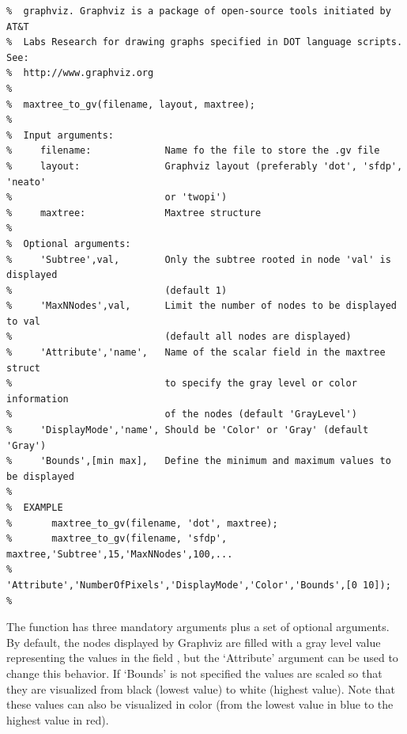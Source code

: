 \documentclass[DIV=calc, paper=a4, fontsize=11pt]{scrartcl}	 %
\begin{document}
\begin{lstlisting}[aboveskip=0.5 \baselineskip]
%  maxtree_to_gv prints the Maxtree on a text file for vizualization with
%  graphviz. Graphviz is a package of open-source tools initiated by AT&T
%  Labs Research for drawing graphs specified in DOT language scripts. See:
%  http://www.graphviz.org
% 
%  maxtree_to_gv(filename, layout, maxtree);
%
%  Input arguments:
%     filename:             Name fo the file to store the .gv file 
%     layout:               Graphviz layout (preferably 'dot', 'sfdp', 'neato' 
%                           or 'twopi')
%     maxtree:              Maxtree structure
%
%  Optional arguments:
%     'Subtree',val,        Only the subtree rooted in node 'val' is displayed 
%                           (default 1)
%     'MaxNNodes',val,      Limit the number of nodes to be displayed to val
%                           (default all nodes are displayed)
%     'Attribute','name',   Name of the scalar field in the maxtree struct 
%                           to specify the gray level or color information 
%                           of the nodes (default 'GrayLevel')
%     'DisplayMode','name', Should be 'Color' or 'Gray' (default 'Gray') 
%     'Bounds',[min max],   Define the minimum and maximum values to be displayed 
% 
%  EXAMPLE
%       maxtree_to_gv(filename, 'dot', maxtree);
%       maxtree_to_gv(filename, 'sfdp', maxtree,'Subtree',15,'MaxNNodes',100,...
%           'Attribute','NumberOfPixels','DisplayMode','Color','Bounds',[0 10]);
%

\end{lstlisting}
The function has three mandatory arguments plus a set of optional arguments. By default, the nodes displayed by Graphviz are filled with a gray level value representing the   values in the field , but the `Attribute' argument can be used to change this behavior. If `Bounds' is not specified the values are scaled so that they are visualized from black (lowest value) to white (highest value). Note that these values can also be visualized in color (from the lowest value in blue to the highest value in red).  
\end{document}
